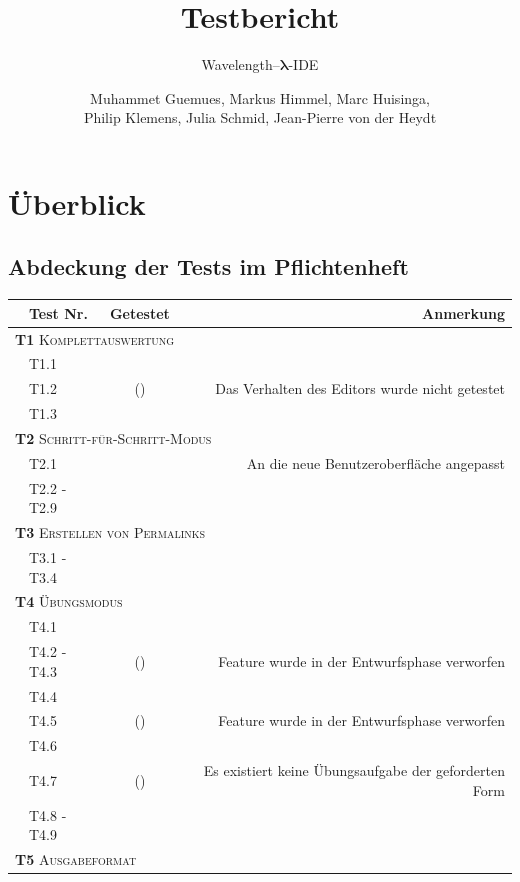 \documentclass[parskip=full,11pt,openany]{scrreprt}
\title{Testbericht}
\subtitle{Wavelength--$\bm{\lambda}$-IDE}
\author{Muhammet Guemues, Markus Himmel, Marc Huisinga,\\Philip Klemens, Julia Schmid, Jean-Pierre von der Heydt}
\newcommand{\cmark}{\ding{51}}%
\newcommand{\xmark}{\ding{55}}%
\begin{document}
\maketitle
\newpage
\tableofcontents
\newpage

\chapter{Überblick}

\section{Abdeckung der Tests im Pflichtenheft}

\begin{table}[h]
	\centering
	\begin{tabular}{@{}llcr@{}}
		\toprule
		&\textbf{Test Nr.} & \textbf{Getestet} &\textbf{Anmerkung} \\ 
		\midrule
		\multicolumn{4}{l}{\small \textsc{\textbf{T1} Komplettauswertung}} \\ 
		&T1.1 & \cmark & \\
		&T1.2 & (\cmark) & Das Verhalten des Editors wurde nicht getestet \\
		&T1.3 & \cmark & \\ 
		\multicolumn{4}{l}{\small \textsc{\textbf{T2} Schritt-für-Schritt-Modus}}\\ 
		&T2.1 & \cmark & An die neue Benutzeroberfläche angepasst \\
		&T2.2 - T2.9 & \cmark & \\
		\multicolumn{4}{l}{\small \textsc{\textbf{T3} Erstellen von Permalinks}}\\ 	
		&T3.1 - T3.4 & \cmark & \\
		\multicolumn{4}{l}{\small \textsc{\textbf{T4} Übungsmodus}}\\ 
		&T4.1 & \cmark & \\
		&T4.2 - T4.3 & (\xmark) & Feature wurde in der Entwurfsphase verworfen \\
		&T4.4 & \cmark & \\
		&T4.5 & (\xmark) & Feature wurde in der Entwurfsphase verworfen \\
		&T4.6 & \cmark & \\
		&T4.7 & (\cmark) & Es existiert keine Übungsaufgabe der geforderten Form \\
		&T4.8 - T4.9 & \cmark & \\
		\multicolumn{4}{l}{\small \textsc{\textbf{T5} Ausgabeformat}}\\ 

\end{tabular}
\end{table}
\end{document}
